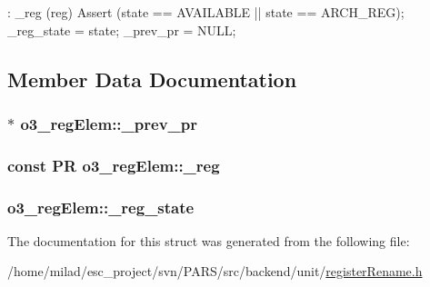 \begin{DoxyCode}
        : _reg (reg)
    {
        Assert (state == AVAILABLE || state == ARCH_REG);
        _reg_state = state;
        _prev_pr = NULL;
    }
\end{DoxyCode}


\subsection{Member Data Documentation}
\hypertarget{structo3__regElem_adf5c32b447e15a5df8b1f51fbc8921f4}{
\subsubsection[{\_\-prev\_\-pr}]{$\ast$ {\bf o3\_\-regElem::\_\-prev\_\-pr}}}
\label{structo3__regElem_adf5c32b447e15a5df8b1f51fbc8921f4}
\hypertarget{structo3__regElem_aeaba0b876f3f04eca64288cc229706a4}{
\subsubsection[{\_\-reg}]{\setlength{\rightskip}{0pt plus 5cm}const {\bf PR} {\bf o3\_\-regElem::\_\-reg}}}
\label{structo3__regElem_aeaba0b876f3f04eca64288cc229706a4}
\hypertarget{structo3__regElem_af75174fd00fb8b24f4a47edf10b2e97a}{
\subsubsection[{\_\-reg\_\-state}]{ {\bf o3\_\-regElem::\_\-reg\_\-state}}}
\label{structo3__regElem_af75174fd00fb8b24f4a47edf10b2e97a}


The documentation for this struct was generated from the following file:\begin{DoxyCompactItemize}
\item 
/home/milad/esc\_\-project/svn/PARS/src/backend/unit/\hyperlink{backend_2unit_2registerRename_8h}{registerRename.h}\end{DoxyCompactItemize}
